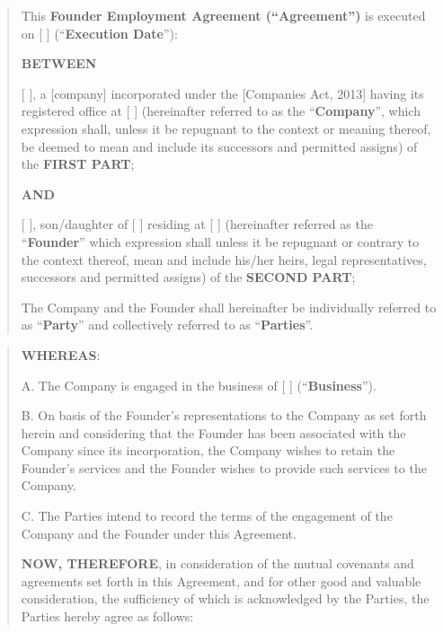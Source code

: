 \documentclass[
]{article}
\author{}
\date{}
\begin{document}

\begin{quote}
This \textbf{Founder Employment Agreement (``Agreement'')} is executed
on {[} {]} (``\textbf{Execution Date}''):

\textbf{BETWEEN}

{[} {]}, a {[}company{]} incorporated under the {[}Companies Act,
2013{]} having its registered office at {[} {]} (hereinafter referred to
as the ``\textbf{Company}'', which expression shall, unless it be
repugnant to the context or meaning thereof, be deemed to mean and
include its successors and permitted assigns) of the \textbf{FIRST
PART};
\par
\textbf{AND}
\par
{[} {]}, son/daughter of {[} {]} residing at {[} {]} (hereinafter
referred as the ``\textbf{Founder}'' which expression shall unless it be
repugnant or contrary to the context thereof, mean and include his/her
heirs, legal representatives, successors and permitted assigns) of the
\textbf{SECOND PART};
\par
\par
The Company and the Founder shall hereinafter be individually referred
to as ``\textbf{Party}'' and collectively referred to as
``\textbf{Parties}''.
\end{quote}


\begin{quote}
\textbf{WHEREAS}:

A. The Company is engaged in the business of {[} {]}
(``\textbf{Business}'').

B. On basis of the Founder's representations to the Company as set forth
herein and considering that the Founder has been associated with the
Company since its incorporation, the Company wishes to retain the
Founder's services and the Founder wishes to provide such services to
the Company.

C. The Parties intend to record the terms of the engagement of the
Company and the Founder under this Agreement.

\par
\par
\textbf{NOW, THEREFORE}, in consideration of the mutual covenants and
agreements set forth in this Agreement, and for other good and valuable
consideration, the sufficiency of which is acknowledged by the Parties,
the Parties hereby agree as follows:
\end{quote}
\end{document}
